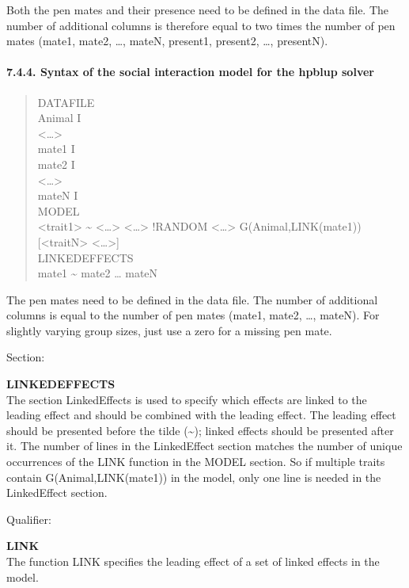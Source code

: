 Both the pen mates and their presence need to be defined in the data
file. The number of additional columns is therefore equal to two times
the number of pen mates (mate1, mate2, \ldots, mateN, present1,
present2, \ldots, presentN).

\paragraph{7.4.4. Syntax of the social interaction model for the hpblup
solver}\label{Stat18}

\begin{quote}
DATAFILE\\
Animal I\\
\textless\ldots\textgreater{}\\
mate1 I\\
mate2 I\\
\textless\ldots\textgreater{}\\
mateN I\\
MODEL\\
\textless trait1\textgreater{} \textasciitilde{}
\textless\ldots\textgreater{} \textless\ldots\textgreater{} !RANDOM
\textless\ldots\textgreater{} G(Animal,LINK(mate1))\\
{[}\textless traitN\textgreater{} \textless\ldots\textgreater{]}\\
LINKEDEFFECTS\\
mate1 \textasciitilde{} mate2 \ldots{} mateN
\end{quote}

The pen mates need to be defined in the data file. The number of
additional columns is equal to the number of pen mates (mate1, mate2,
\ldots, mateN). For slightly varying group sizes, just use a zero for a
missing pen mate.

Section:

\textbf{LINKEDEFFECTS}\\
The section LinkedEffects is used to specify which effects are linked to
the leading effect and should be combined with the leading effect. The
leading effect should be presented before the tilde (\textasciitilde);
linked effects should be presented after it. The number of lines in the
LinkedEffect section matches the number of unique occurrences of the
LINK function in the MODEL section. So if multiple traits contain
G(Animal,LINK(mate1)) in the model, only one line is needed in the
LinkedEffect section.

Qualifier:

\textbf{LINK}\\
The function LINK specifies the leading effect of a set of linked
effects in the model.

